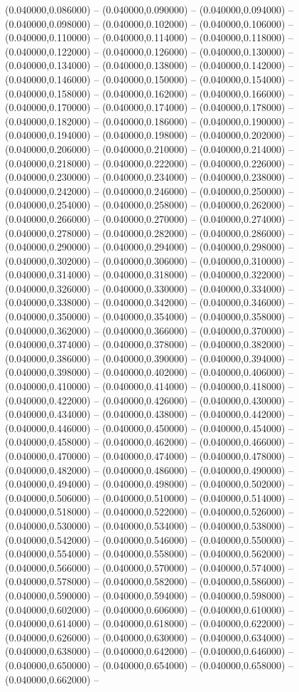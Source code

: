 (0.040000,0.086000) -- (0.040000,0.090000) -- (0.040000,0.094000) -- (0.040000,0.098000) -- (0.040000,0.102000) -- (0.040000,0.106000) -- (0.040000,0.110000) -- (0.040000,0.114000) -- (0.040000,0.118000) -- (0.040000,0.122000) -- (0.040000,0.126000) -- (0.040000,0.130000) -- (0.040000,0.134000) -- (0.040000,0.138000) -- (0.040000,0.142000) -- (0.040000,0.146000) -- (0.040000,0.150000) -- (0.040000,0.154000) -- (0.040000,0.158000) -- (0.040000,0.162000) -- (0.040000,0.166000) -- (0.040000,0.170000) -- (0.040000,0.174000) -- (0.040000,0.178000) -- (0.040000,0.182000) -- (0.040000,0.186000) -- (0.040000,0.190000) -- (0.040000,0.194000) -- (0.040000,0.198000) -- (0.040000,0.202000) -- (0.040000,0.206000) -- (0.040000,0.210000) -- (0.040000,0.214000) -- (0.040000,0.218000) -- (0.040000,0.222000) -- (0.040000,0.226000) -- (0.040000,0.230000) -- (0.040000,0.234000) -- (0.040000,0.238000) -- (0.040000,0.242000) -- (0.040000,0.246000) -- (0.040000,0.250000) -- (0.040000,0.254000) -- (0.040000,0.258000) -- (0.040000,0.262000) -- (0.040000,0.266000) -- (0.040000,0.270000) -- (0.040000,0.274000) -- (0.040000,0.278000) -- (0.040000,0.282000) -- (0.040000,0.286000) -- (0.040000,0.290000) -- (0.040000,0.294000) -- (0.040000,0.298000) -- (0.040000,0.302000) -- (0.040000,0.306000) -- (0.040000,0.310000) -- (0.040000,0.314000) -- (0.040000,0.318000) -- (0.040000,0.322000) -- (0.040000,0.326000) -- (0.040000,0.330000) -- (0.040000,0.334000) -- (0.040000,0.338000) -- (0.040000,0.342000) -- (0.040000,0.346000) -- (0.040000,0.350000) -- (0.040000,0.354000) -- (0.040000,0.358000) -- (0.040000,0.362000) -- (0.040000,0.366000) -- (0.040000,0.370000) -- (0.040000,0.374000) -- (0.040000,0.378000) -- (0.040000,0.382000) -- (0.040000,0.386000) -- (0.040000,0.390000) -- (0.040000,0.394000) -- (0.040000,0.398000) -- (0.040000,0.402000) -- (0.040000,0.406000) -- (0.040000,0.410000) -- (0.040000,0.414000) -- (0.040000,0.418000) -- (0.040000,0.422000) -- (0.040000,0.426000) -- (0.040000,0.430000) -- (0.040000,0.434000) -- (0.040000,0.438000) -- (0.040000,0.442000) -- (0.040000,0.446000) -- (0.040000,0.450000) -- (0.040000,0.454000) -- (0.040000,0.458000) -- (0.040000,0.462000) -- (0.040000,0.466000) -- (0.040000,0.470000) -- (0.040000,0.474000) -- (0.040000,0.478000) -- (0.040000,0.482000) -- (0.040000,0.486000) -- (0.040000,0.490000) -- (0.040000,0.494000) -- (0.040000,0.498000) -- (0.040000,0.502000) -- (0.040000,0.506000) -- (0.040000,0.510000) -- (0.040000,0.514000) -- (0.040000,0.518000) -- (0.040000,0.522000) -- (0.040000,0.526000) -- (0.040000,0.530000) -- (0.040000,0.534000) -- (0.040000,0.538000) -- (0.040000,0.542000) -- (0.040000,0.546000) -- (0.040000,0.550000) -- (0.040000,0.554000) -- (0.040000,0.558000) -- (0.040000,0.562000) -- (0.040000,0.566000) -- (0.040000,0.570000) -- (0.040000,0.574000) -- (0.040000,0.578000) -- (0.040000,0.582000) -- (0.040000,0.586000) -- (0.040000,0.590000) -- (0.040000,0.594000) -- (0.040000,0.598000) -- (0.040000,0.602000) -- (0.040000,0.606000) -- (0.040000,0.610000) -- (0.040000,0.614000) -- (0.040000,0.618000) -- (0.040000,0.622000) -- (0.040000,0.626000) -- (0.040000,0.630000) -- (0.040000,0.634000) -- (0.040000,0.638000) -- (0.040000,0.642000) -- (0.040000,0.646000) -- (0.040000,0.650000) -- (0.040000,0.654000) -- (0.040000,0.658000) -- (0.040000,0.662000) -- 